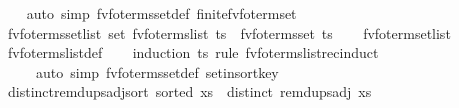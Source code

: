 \begin{isabellebody}
%
\isadelimproof
\ \ %
\endisadelimproof
%
\isatagproof
{}\isamarkupfalse%
\ {\isacharparenleft}{\kern0pt}auto\ simp{\isacharcolon}{\kern0pt}\ fv{\isacharunderscore}{\kern0pt}fo{\isacharunderscore}{\kern0pt}terms{\isacharunderscore}{\kern0pt}set{\isacharunderscore}{\kern0pt}def\ finite{\isacharunderscore}{\kern0pt}fv{\isacharunderscore}{\kern0pt}fo{\isacharunderscore}{\kern0pt}term{\isacharunderscore}{\kern0pt}set{\isacharparenright}{\kern0pt}%
\endisatagproof
{\isafoldproof}%
%
\isadelimproof
\isanewline
%
\endisadelimproof
\isanewline
{}\isamarkupfalse%
\ fv{\isacharunderscore}{\kern0pt}fo{\isacharunderscore}{\kern0pt}terms{\isacharunderscore}{\kern0pt}set{\isacharunderscore}{\kern0pt}list{\isacharcolon}{\kern0pt}\ {\isachardoublequoteopen}set\ {\isacharparenleft}{\kern0pt}fv{\isacharunderscore}{\kern0pt}fo{\isacharunderscore}{\kern0pt}terms{\isacharunderscore}{\kern0pt}list\ ts{\isacharparenright}{\kern0pt}\ {\isacharequal}{\kern0pt}\ fv{\isacharunderscore}{\kern0pt}fo{\isacharunderscore}{\kern0pt}terms{\isacharunderscore}{\kern0pt}set\ ts{\isachardoublequoteclose}\isanewline
%
\isadelimproof
\ \ %
\endisadelimproof
%
\isatagproof
{}\isamarkupfalse%
\ fv{\isacharunderscore}{\kern0pt}fo{\isacharunderscore}{\kern0pt}term{\isacharunderscore}{\kern0pt}set{\isacharunderscore}{\kern0pt}list\isanewline
\ \ \isamarkupfalse%
\ fv{\isacharunderscore}{\kern0pt}fo{\isacharunderscore}{\kern0pt}terms{\isacharunderscore}{\kern0pt}list{\isacharunderscore}{\kern0pt}def\isanewline
\ \ \isamarkupfalse%
\ {\isacharparenleft}{\kern0pt}induction\ ts\ rule{\isacharcolon}{\kern0pt}\ fv{\isacharunderscore}{\kern0pt}fo{\isacharunderscore}{\kern0pt}terms{\isacharunderscore}{\kern0pt}list{\isacharunderscore}{\kern0pt}rec{\isachardot}{\kern0pt}induct{\isacharparenright}{\kern0pt}\isanewline
\ \ \ \ \ {\isacharparenleft}{\kern0pt}auto\ simp{\isacharcolon}{\kern0pt}\ fv{\isacharunderscore}{\kern0pt}fo{\isacharunderscore}{\kern0pt}terms{\isacharunderscore}{\kern0pt}set{\isacharunderscore}{\kern0pt}def\ set{\isacharunderscore}{\kern0pt}insort{\isacharunderscore}{\kern0pt}key{\isacharparenright}{\kern0pt}%
\endisatagproof
{\isafoldproof}%
%
\isadelimproof
\isanewline
%
\endisadelimproof
\isanewline
{}\isamarkupfalse%
\ distinct{\isacharunderscore}{\kern0pt}remdups{\isacharunderscore}{\kern0pt}adj{\isacharunderscore}{\kern0pt}sort{\isacharcolon}{\kern0pt}\ {\isachardoublequoteopen}sorted\ xs\ {\isasymLongrightarrow}\ distinct\ {\isacharparenleft}{\kern0pt}remdups{\isacharunderscore}{\kern0pt}adj\ xs{\isacharparenright}{\kern0pt}{\isachardoublequoteclose}\isanewline

\end{isabellebody}
